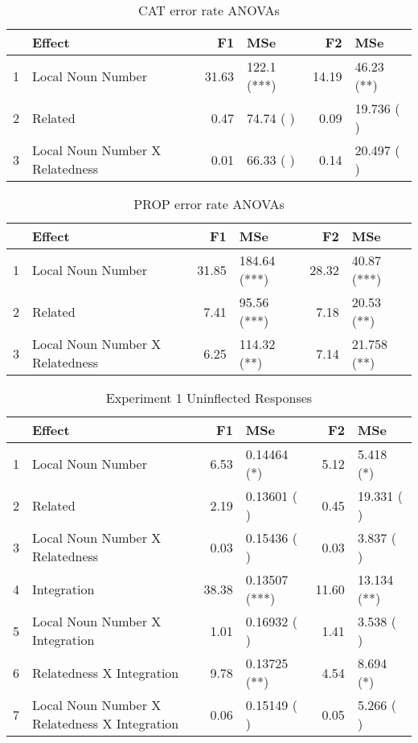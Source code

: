 \documentclass[a4paper,11pt]{article}\usepackage[]{graphicx}\usepackage[]{color}
\begin{document}
\begin{table}[ht]
\centering
\begin{tabular}{rlrlrl}
  \hline
 & Effect & F1 & MSe & F2 & MSe \\ 
  \hline
1 & Local Noun Number & 31.63 & 122.1 (***) & 14.19 & 46.23 (**) \\ 
  2 & Related & 0.47 & 74.74 ( ) & 0.09 & 19.736 ( ) \\ 
  3 & Local Noun Number X Relatedness & 0.01 & 66.33 ( ) & 0.14 & 20.497 ( ) \\ 
   \hline
\end{tabular}
\caption[CAT Error Rate ANOVAs]{CAT error rate ANOVAs} 
\end{table}


\begin{table}[ht]
\centering
\begin{tabular}{rlrlrl}
  \hline
 & Effect & F1 & MSe & F2 & MSe \\ 
  \hline
1 & Local Noun Number & 31.85 & 184.64 (***) & 28.32 & 40.87 (***) \\ 
  2 & Related & 7.41 & 95.56 (***) & 7.18 & 20.53 (**) \\ 
  3 & Local Noun Number X Relatedness & 6.25 & 114.32 (**) & 7.14 & 21.758 (**) \\ 
   \hline
\end{tabular}
\caption[PROP Error Rate ANOVAs]{PROP error rate ANOVAs} 
\end{table}


\begin{table}[ht]
\centering
\begin{tabular}{rlrlrl}
  \hline
 & Effect & F1 & MSe & F2 & MSe \\ 
  \hline
1 & Local Noun Number & 6.53 & 0.14464 (*) & 5.12 & 5.418 (*) \\ 
  2 & Related & 2.19 & 0.13601 ( ) & 0.45 & 19.331 ( ) \\ 
  3 & Local Noun Number X Relatedness & 0.03 & 0.15436 ( ) & 0.03 & 3.837 ( ) \\ 
  4 & Integration & 38.38 & 0.13507 (***) & 11.60 & 13.134 (**) \\ 
  5 & Local Noun Number X Integration & 1.01 & 0.16932 ( ) & 1.41 & 3.538 ( ) \\ 
  6 & Relatedness X Integration & 9.78 & 0.13725 (**) & 4.54 & 8.694 (*) \\ 
  7 & Local Noun Number X Relatedness X Integration & 0.06 & 0.15149 ( ) & 0.05 & 5.266 ( ) \\ 
   \hline
\end{tabular}
\caption[Exp. 1 Uninflected]{Experiment 1 Uninflected Responses} 
\end{table}
\end{document}
